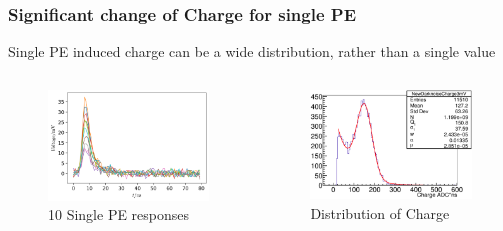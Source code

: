 \documentclass{beamer}
\begin{document}
\begin{frame}
\frametitle{Significant change of Charge for single PE}
\hspace{8mm}Single PE induced charge can be a wide distribution, rather than a single value
\begin{columns}
\begin{figure}
    \centering
    \caption{10 Single PE responses}
    \includegraphics[width=1.0\linewidth]{img/spewaves.png}
\end{figure}
\begin{figure}
    \centering
    \caption{Distribution of Charge}
    \includegraphics[width=1.0\linewidth]{img/chargehist.png}
\end{figure}
\end{columns}
\end{frame}
\end{document}
